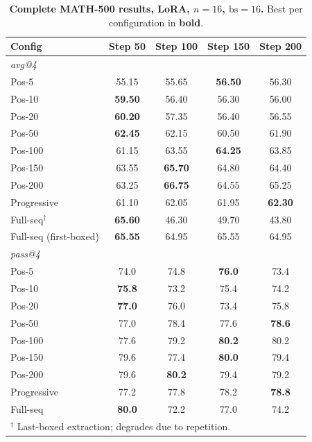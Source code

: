 \documentclass[10pt]{article}
\begin{document}
\begin{table}[!htbp]
\centering
\caption{\textbf{Complete MATH-500 results, LoRA, $n{=}16$, $\text{bs}{=}16$.} Best per configuration in \textbf{bold}.}
\label{tab:app_math_n16}
\footnotesize
\begin{tabular}{lcccc}
\toprule
\textbf{Config} & \textbf{Step 50} & \textbf{Step 100} & \textbf{Step 150} & \textbf{Step 200} \\
\midrule
\multicolumn{5}{l}{\textit{avg@4}} \\
\midrule
Pos-5 & 55.15 & 55.65 & \textbf{56.50} & 56.30 \\
Pos-10 & \textbf{59.50} & 56.40 & 56.30 & 56.00 \\
Pos-20 & \textbf{60.20} & 57.35 & 56.40 & 56.55 \\
Pos-50 & \textbf{62.45} & 62.15 & 60.50 & 61.90 \\
Pos-100 & 61.15 & 63.55 & \textbf{64.25} & 63.85 \\
Pos-150 & 63.55 & \textbf{65.70} & 64.80 & 64.40 \\
Pos-200 & 63.25 & \textbf{66.75} & 64.55 & 65.25 \\
Progressive & 61.10 & 62.05 & 61.95 & \textbf{62.30} \\
Full-seq$^\dagger$ & \textbf{65.60} & 46.30 & 49.70 & 43.80 \\
Full-seq (first-boxed) & \textbf{65.55} & 64.95 & 65.55 & 64.95 \\
\midrule
\multicolumn{5}{l}{\textit{pass@4}} \\
\midrule
Pos-5 & 74.0 & 74.8 & \textbf{76.0} & 73.4 \\
Pos-10 & \textbf{75.8} & 73.2 & 75.4 & 74.2 \\
Pos-20 & \textbf{77.0} & 76.0 & 73.4 & 75.8 \\
Pos-50 & 77.0 & 78.4 & 77.6 & \textbf{78.6} \\
Pos-100 & 77.6 & 79.2 & \textbf{80.2} & 80.2 \\
Pos-150 & 79.6 & 77.4 & \textbf{80.0} & 79.4 \\
Pos-200 & 79.6 & \textbf{80.2} & 79.4 & 79.2 \\
Progressive & 77.2 & 77.8 & 78.2 & \textbf{78.8} \\
Full-seq & \textbf{80.0} & 72.2 & 77.0 & 74.2 \\
\bottomrule
\multicolumn{5}{l}{\footnotesize $^\dagger$ Last-boxed extraction; degrades due to repetition.}
\end{tabular}
\end{table}
\end{document}
